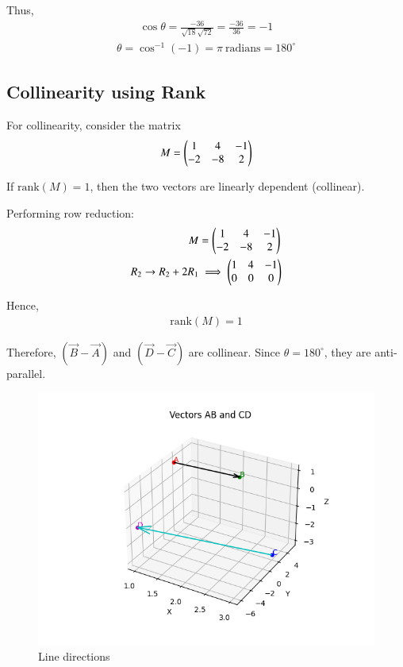 \documentclass[12pt]{article}
\begin{document}
Thus,
\begin{align}
\cos\theta = \frac{-36}{\sqrt{18}\sqrt{72}} 
= \frac{-36}{36} = -1
\end{align}
\begin{align}
\theta = \cos^{-1}(-1) = \pi \ \text{radians} = 180^\circ
\end{align}

\subsection*{Collinearity using Rank}
For collinearity, consider the matrix
\begin{align}
M = \begin{pmatrix}1 & 4 & -1 \\ -2 & -8 & 2\end{pmatrix}
\end{align}

If $\text{rank}(M)=1$, then the two vectors are linearly dependent (collinear).

Performing row reduction:
\begin{align}
M &= \begin{pmatrix}1 & 4 & -1 \\ -2 & -8 & 2\end{pmatrix} \\
R_2 \to R_2 + 2R_1 &\implies \begin{pmatrix}1 & 4 & -1 \\ 0 & 0 & 0\end{pmatrix}
\end{align}

Hence,
\begin{align}
\text{rank}(M) = 1
\end{align}

Therefore, $(\vec{B}-\vec{A})$ and $(\vec{D}-\vec{C})$ are collinear. Since $\theta = 180^\circ$, they are anti-parallel.

\begin{figure}[H]
    \centering
    \includegraphics[width=0.7\columnwidth]{Figs/Figure.png}
    \caption{Line directions}
    \label{fig:ab_cd}
\end{figure}
\end{document}
